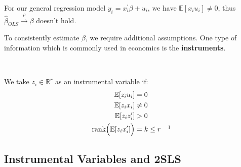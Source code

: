 For our general regression model $y_i = x_i^{\prime} \beta + u_i$, we have $\mathbb{E}[x_i u_i] \neq 0$,
thus $\hat{\beta}_{OLS} \overset{\rho}{\rightarrow} \beta$ doesn't hold.

To consistently estimate $\beta$, we require additional assumptions.
One type of information which is commonly used in economics is the \textbf{instruments}.

\begin{definition}\label{def:IV}
    \

    We take $z_i \in \mathbb{R}^r$ as an instrumental variable if:
    \begin{align*}
        \mathbb{E}[z_i u_i] &= 0 \\
        \mathbb{E}[z_i x_i] &\neq 0 \\
        \mathbb{E}[z_i z_i^{\prime}] &> 0 \\
        \rank \Bigl(\mathbb{E}[z_i x_i^{\prime}] \Bigr) &= k \leq r \quad \footnotemark
    \end{align*}
\end{definition}

\subsection{Instrumental Variables and 2SLS}


